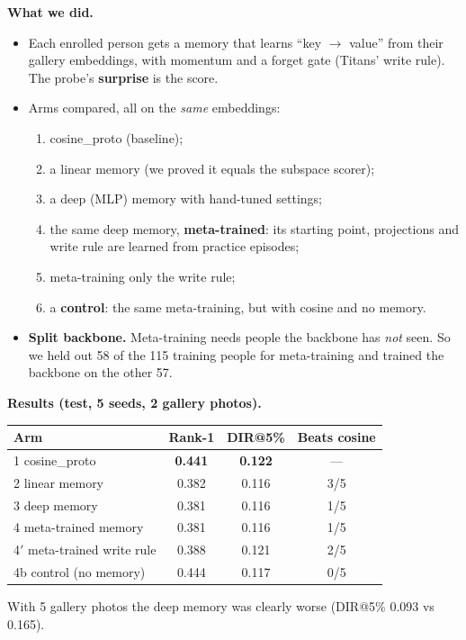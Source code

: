 \documentclass[11pt,a4paper]{article}
\begin{document}
\textbf{What we did.}
\begin{itemize}
  \item Each enrolled person gets a memory that learns ``key $\to$ value'' from their gallery embeddings, with momentum and a forget gate (Titans' write rule). The probe's \textbf{surprise} is the score.
  \item Arms compared, all on the \emph{same} embeddings:
  \begin{enumerate}[leftmargin=1.4em]
    \item cosine\_proto (baseline);
    \item a linear memory (we proved it equals the subspace scorer);
    \item a deep (MLP) memory with hand-tuned settings;
    \item the same deep memory, \textbf{meta-trained}: its starting point, projections and write rule are learned from practice episodes;
    \item[4$'$.] meta-training only the write rule;
    \item[4b.] a \textbf{control}: the same meta-training, but with cosine and no memory.
  \end{enumerate}
  \item \textbf{Split backbone.} Meta-training needs people the backbone has \emph{not} seen. So we held out 58 of the 115 training people for meta-training and trained the backbone on the other 57.
\end{itemize}

\textbf{Results (test, 5 seeds, 2 gallery photos).}
\begin{center}
\begin{tabular}{@{}lccc@{}}
\toprule
\textbf{Arm} & \textbf{Rank-1} & \textbf{DIR@5\%} & \textbf{Beats cosine}\\
\midrule
1 cosine\_proto & \textbf{0.441} & \textbf{0.122} & ---\\
2 linear memory & 0.382 & 0.116 & 3/5\\
3 deep memory & 0.381 & 0.116 & 1/5\\
4 meta-trained memory & 0.381 & 0.116 & 1/5\\
4$'$ meta-trained write rule & 0.388 & 0.121 & 2/5\\
4b control (no memory) & 0.444 & 0.117 & 0/5\\
\bottomrule
\end{tabular}
\end{center}
With 5 gallery photos the deep memory was clearly worse (DIR@5\% 0.093 vs 0.165).
\end{document}
